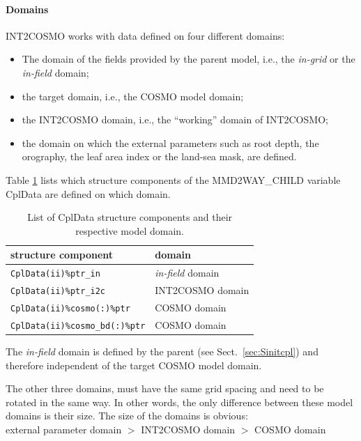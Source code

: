 \documentclass[11pt,twoside]{article}
\newcommand{\blockcode}{\ttfamily\color{OliveGreen}\par}
\begin{document}
\paragraph{Domains\\}
INT2COSMO works with data defined on four different domains:
\begin{itemize}
\item[1.] The domain of the fields provided by the parent model, i.e., the
{\it in-grid} or the {\it in-field} domain;
\item[2.] the target domain, i.e., the COSMO model domain;
\item[3.] the INT2COSMO domain, i.e., the ``working'' domain of INT2COSMO;
\item[4.] the domain on which the external parameters such as root depth, the 
orography, the leaf area index or the land-sea mask, are defined. 
\end{itemize}
Table \ref{tab:domain1} lists which structure components of the MMD2WAY\_CHILD
variable 
CplData are defined on which domain.
\begin{table} 
\begin{center}
\caption{List of CplData structure components and their respective model domain. \label{tab:domain1}}
{\blockcode
\begin{tabular}{l|l}
structure component & domain \\\hline
{\tt CplData(ii)\%ptr\_in} & {\it in-field} domain \\
{\tt CplData(ii)\%ptr\_i2c}& INT2COSMO domain \\
{\tt CplData(ii)\%cosmo(:)\%ptr} & COSMO domain \\
{\tt CplData(ii)\%cosmo\_bd(:)\%ptr} & COSMO domain \\\hline
 \end{tabular}
}
\end{center}
\end{table}

The {\it in-field} domain is defined by the parent (see Sect.\ 
\ref{sec:Sinitcpl}) and therefore independent of the target COSMO model domain.

The other three domains, must have the same grid spacing and need to be 
rotated in the same way. In other words, the only difference between these model
 domains is their size. The size of the domains is obvious:\\

external parameter domain $>$ INT2COSMO domain $ >$ COSMO domain\\
\end{document}
